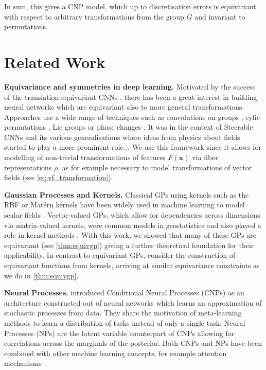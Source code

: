 In sum, this gives a CNP model, which up to discretisation errors is equivariant with respect to arbitrary transformations from the group $G$ and invariant to permutations.

\section{Related Work}
\textbf{Equivariance and symmetries in deep learning.}
Motivated by the success of the translation-equivariant CNNs \parencite{Classical_CNNs}, there has been a great interest in building neural networks which are equivariant also to more general transformations.
Approaches use a wide range of techniques such as convolutions on groups \parencite{SphericalCNNs,KondTrivGen,G_CNNs,HexaConv,CubeNet}, cylic permutations \parencite{CyclicSymmetry}, Lie groups \parencite{LieGroup} or phase changes \parencite{HarmonicNetworks}.
It was in the context of Steerable CNNs and its various generalisations where ideas from physics about fields started to play a more prominent role.
\parencite{SteerCNNs,3DSteerable,E2Steerable,Homogenous_spaces}.
We use this framework since it allows for modelling of non-trivial transformations of features $F(\mathbf{x})$ via fiber representations $\rho$, as for example necessary to model transformations of vector fields (see \cref{eq:vf_transformation}).

\textbf{Gaussian Processes and Kernels.}
Classical GPs using kernels such as the RBF or Mat\'ern kernels have been widely used in machine learning to model scalar fields \parencite{GP_book}.
Vector-valued GPs, which allow for dependencies across dimensions via matrix-valued kernels, were common models in geostatistics \parencite{geostatistics} and also played a role in kernel methods \parencite{Review_matrix_kernels}.
With this work, we showed that many of these GPs are equivariant (see \cref{thm:equivgp}) giving a further theoretical foundation for their applicability.
In contrast to equivariant GPs, \textcite{Reissert} consider the construction of equivariant functions from kernels, arriving at similar equivariance constraints as we do in \cref{thm:equivgp}.

\textbf{Neural Processes.} \textcite{CNPs} introduced Conditional Neural Processes (CNPs) as an architecture constructed out of neural networks which learns an approximation of stochastic processes from data.
They share the motivation of meta-learning methods \parencite{MAML,GradDescentbyGradDescent} to learn a distribution of tasks instead of only a single task.
Neural Processes (NPs) are the latent variable counterpart of CNPs allowing for correlations across the marginals of the posterior.
Both CNPs and NPs have been combined with other machine learning concepts, for example attention mechanisms \parencite{attNP}.


